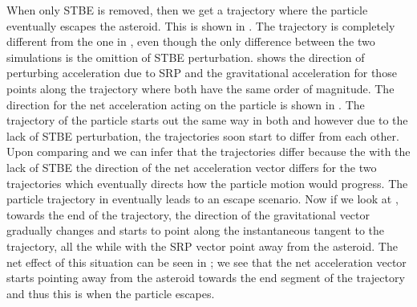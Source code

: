 When only \gls{STBE} is removed, then we get a trajectory where the particle eventually escapes the asteroid. This is shown in . The trajectory is completely different from the one in , even though the only difference between the two simulations is the omittion of \gls{STBE} perturbation.  shows the direction of perturbing acceleration due to \gls{SRP} and the gravitational acceleration for those points along the trajectory where both have the same order of magnitude. The direction for the net acceleration acting on the particle is shown in . The trajectory of the particle starts out the same way in both  and  however due to the lack of \gls{STBE} perturbation, the trajectories soon start to differ from each other. Upon comparing  and  we can infer that the trajectories differ because the with the lack of \gls{STBE} the direction of the net acceleration vector differs for the two trajectories which eventually directs how the particle motion would progress. The particle trajectory in  eventually leads to an escape scenario. Now if we look at , towards the end of the trajectory, the direction of the gravitational vector gradually changes and starts to point along the instantaneous tangent to the trajectory, all the while with the \gls{SRP} vector point away from the asteroid. The net effect of this situation can be seen in ; we see that the net acceleration vector starts pointing away from the asteroid towards the end segment of the trajectory and thus this is when the particle escapes.
